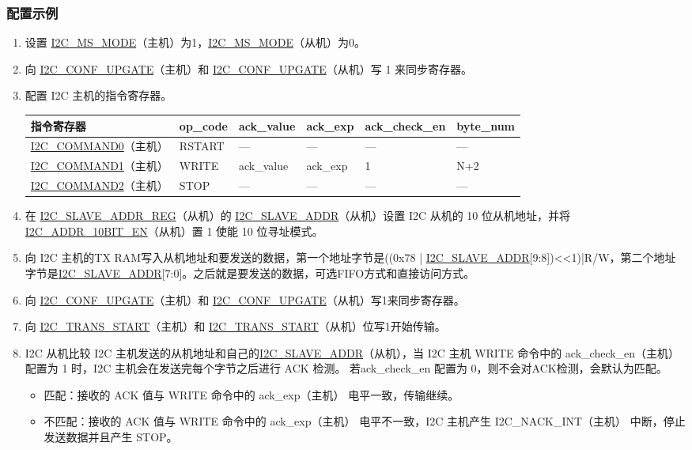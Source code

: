 \documentclass[main\_\_CN.tex]{subfiles}
\begin{document}
\subsubsection{配置示例}
\begin{enumerate}
\item 设置 \hyperref[fielddesc:I2CMSMODE]{I2C\_MS\_MODE}（主机）为1，\hyperref[fielddesc:I2CMSMODE]{I2C\_MS\_MODE}（从机）为0。
\item 向 \hyperref[fielddesc:I2CCONFUPGATE]{I2C\_CONF\_UPGATE}（主机）和 \hyperref[fielddesc:I2CCONFUPGATE]{I2C\_CONF\_UPGATE}（从机）写 1 来同步寄存器。
\item 配置 I2C 主机的指令寄存器。

\begin{longtable}{ | p{4cm} | p{2cm} | p{2cm} | p{2cm} |p{2cm} | p{2cm} |}
\hline\rowcolor{lightgray}
指令寄存器& op\_code & ack\_value&ack\_exp&ack\_check\_en&byte\_num  \\ \hline
\hyperref[fielddesc:I2CCOMMAND0]{I2C\_COMMAND0}（主机）& RSTART& ---&---&---&---  \\ \hline
\hyperref[fielddesc:I2CCOMMAND1]{I2C\_COMMAND1}（主机）& WRITE& ack\_value&ack\_exp&1&N+2  \\ \hline
\hyperref[fielddesc:I2CCOMMAND2]{I2C\_COMMAND2}（主机）& STOP& ---&---&---&---  \\ \hline
\end{longtable}

\item 在 \hyperref[regdesc:I2CSLAVEADDRREG]{I2C\_SLAVE\_ADDR\_REG}（从机）的 \hyperref[fielddesc:I2CSLAVEADDR]{I2C\_SLAVE\_ADDR}（从机）设置 I2C 从机的 10 位从机地址，并将 \hyperref[fielddesc:I2CADDR10BITEN]{I2C\_ADDR\_10BIT\_EN}（从机）置 1 使能 10 位寻址模式。
\item 向 I2C 主机的TX RAM写入从机地址和要发送的数据，第一个地址字节是((0x{}78 | \hyperref[fielddesc:I2CSLAVEADDR]{I2C\_SLAVE\_ADDR}[9:8])<<1)|R/W，第二个地址字节是\hyperref[fielddesc:I2CSLAVEADDR]{I2C\_SLAVE\_ADDR}[7:0]。之后就是要发送的数据，可选FIFO方式和直接访问方式。
\item 向 \hyperref[fielddesc:I2CCONFUPGATE]{I2C\_CONF\_UPGATE}（主机）和 \hyperref[fielddesc:I2CCONFUPGATE]{I2C\_CONF\_UPGATE}（从机）写1来同步寄存器。
\item 向 \hyperref[fielddesc:I2CTRANSSTART]{I2C\_TRANS\_START}（主机）和 \hyperref[fielddesc:I2CTRANSSTART]{I2C\_TRANS\_START}（从机）位写1开始传输。
\item I2C 从机比较 I2C 主机发送的从机地址和自己的\hyperref[fielddesc:I2CSLAVEADDR]{I2C\_SLAVE\_ADDR}（从机），当 I2C 主机 WRITE 命令中的 ack\_check\_en（主机） 配置为 1 时，I2C 主机会在发送完每个字节之后进行 ACK 检测。 若ack\_check\_en 配置为 0，则不会对ACK检测，会默认为匹配。
\begin{itemize}
\item 匹配：接收的 ACK 值与 WRITE 命令中的 ack\_exp（主机） 电平一致，传输继续。
\item 不匹配：接收的 ACK 值与 WRITE 命令中的 ack\_exp（主机） 电平不一致，I2C 主机产生 I2C\_NACK\_INT（主机） 中断，停止发送数据并且产生 STOP。
\end{itemize}


\end{enumerate}
\end{document}
